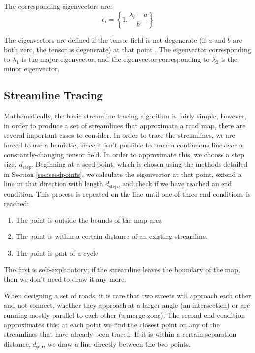 \documentclass[twocolumn]{article}
\begin{document}
The corresponding eigenvectors are:
\[
    \epsilon_i = \left\{1,\frac{\lambda_i-a}{b}\right\}
\]

The eigenvectors are defined if the tensor field is not degenerate (if $a$ and
$b$ are both zero, the tensor is degenerate) at that point \cite{find-evs}. The
eigenvector corresponding to $\lambda_1$ is the major eigenvector, and the
eigenvector corresponding to $\lambda_2$ is the minor eigenvector.

\subsection{Streamline Tracing}
Mathematically, the basic streamline tracing algorithm is fairly simple,
however, in order to produce a set of streamlines that approximate a road map,
there are several important cases to consider. In order to trace the
streamlines, we are forced to use a heuristic, since it isn't possible to trace
a continuous line over a constantly-changing tensor field. In order to
approximate this, we choose a step size, $d_\textrm{step}$. Beginning at a seed
point, which is chosen using the methods detailed in Section
\ref{sec:seedpoints}, we calculate the eigenvector at that point, extend a line
in that direction with length $d_\textrm{step}$, and check if we have reached
an end condition.  This process is repeated on the line until one of three end
conditions is reached:

\begin{enumerate}
    \item The point is outside the bounds of the map area
    \item The point is within a certain distance of an existing streamline.
    \item The point is part of a cycle
\end{enumerate}

The first is self-explanatory; if the streamline leaves the boundary of the
map, then we don't need to draw it any more.

When designing a set of roads, it is rare that two streets will approach each
other and not connect, whether they approach at a larger angle (an
intersection) or are running mostly parallel to each other (a merge zone). The
second end condition approximates this; at each point we find the closest point
on any of the streamlines that have already been traced.  If it is within a
certain separation distance, $d_\textrm{sep}$, we draw a line directly between
the two points.
\end{document}
